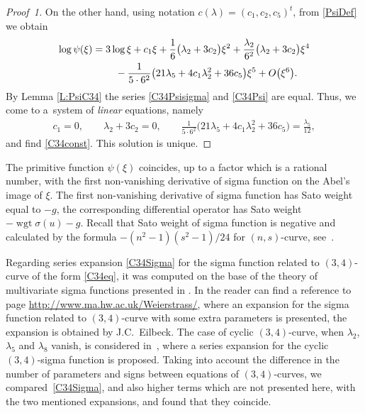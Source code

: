 \documentclass[pdftex]{sigma}
\numberwithin{equation}{section}
\DeclareMathOperator{\wgt}{wgt}
\begin{document}
\begin{proof}[Proof~1]
On the other hand, using notation $c(\lambda)=(c_1,c_2,c_5)^t$, from \eqref{PsiDef} we obtain
\begin{gather}
 \log \psi(\xi) = 3 \log \xi + c_1 \xi + \frac{1}{6} \big(\lambda_2+3c_2 \big) \xi^2
 + \frac{\lambda_2}{6^2} \big(\lambda_2+3 c_2 \big) \xi^4\nonumber\\
 \hphantom{\log \psi(\xi) =}{} - \frac{1}{5\cdot 6^2} \big(21\lambda_5 +4 c_1 \lambda_2^2 + 36 c_5\big)\xi^5 + O\big(\xi^6\big).\label{C34Psi}
\end{gather}
By Lemma \ref{L:PsiC34} the series \eqref{C34Psisigma} and \eqref{C34Psi} are equal. Thus, we come to a~system of \emph{linear} equations, namely
\begin{gather*}
 c_1 = 0,\qquad \lambda_2+3c_2 =0,\qquad \frac{1}{5\cdot 6^2} \big(21\lambda_5 + 4 c_1 \lambda_2^2 + 36 c_5\big)= \frac{\lambda_5}{12},
\end{gather*}
and find \eqref{C34const}. {This solution is unique.}
\end{proof}

\begin{Remark}\label{R:SigmaDer} The primitive function $\psi(\xi)$ coincides, up to a factor which is a rational number, with the first non-vanishing derivative of sigma function on the Abel's image of $\xi$. The first non-vanishing derivative of sigma function has Sato weight equal to $-g$, the corresponding differential operator has Sato weight $-\wgt \sigma (u)-g$. Recall that Sato weight of sigma function is negative and calculated by the formula $-(n^2-1)(s^2-1)/24$ for $(n,s)$-curve, see~\cite{BEL1999}.
\end{Remark}
\begin{Remark}\label{R:SigmaExpansion}
Regarding series expansion \eqref{C34Sigma} for the sigma function related to $(3,4)$-curve of the form \eqref{C34eq}, it was computed on the base of the theory of multivariate sigma functions presented in \cite{BL2004,BL2008}. In \cite[ref.~15]{EEMOP2007} the reader can find a reference to page \url{http://www.ma.hw.ac.uk/Weierstrass/}, where an expansion for the sigma function related to $(3,4)$-curve with some extra parameters is presented, the expansion is obtained by J.C.~Eilbeck. The case of cyclic $(3,4)$-curve, when $\lambda_2$, $\lambda_5$ and $\lambda_8$ vanish, is considered in~\cite{EEMOP2007}, %
where a series expansion for the cyclic $(3,4)$-sigma function is proposed. Taking into account the difference in the number of parameters and signs between equations of $(3,4)$-curves, we compared~\eqref{C34Sigma}, and also higher terms which are not presented here, with the two mentioned expansions, and found that they coincide.
\end{Remark}
\end{document}
